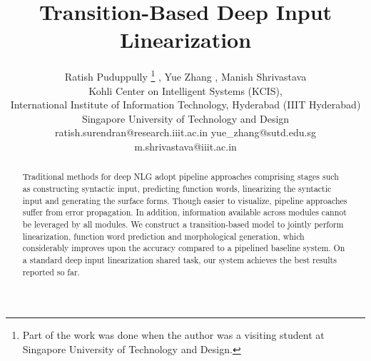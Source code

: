 \documentclass[11pt]{article}
\title{Transition-Based Deep Input Linearization}
\author{Ratish Puduppully \dag \thanks{\hspace{1.5mm}Part of the work was done when the author was a visiting student at Singapore University of Technology and Design.} , Yue Zhang \ddag, Manish Shrivastava \dag\\
  \dag Kohli Center on Intelligent Systems (KCIS),\\
International Institute of Information Technology, Hyderabad (IIIT Hyderabad)\\
  \ddag Singapore University of Technology and Design \\
  ratish.surendran@research.iiit.ac.in   \hfill yue\_zhang@sutd.edu.sg \\ m.shrivastava@iiit.ac.in\\}
\date{}
\begin{document}
\maketitle
\begin{abstract}
Traditional methods for deep NLG adopt pipeline approaches comprising stages such as constructing syntactic input, predicting function words, linearizing the syntactic input and generating the surface forms. Though easier to visualize, pipeline approaches suffer from error propagation. In addition, information available across modules cannot be leveraged by all modules. We construct a transition-based model to jointly perform linearization, function word prediction and morphological generation, which considerably improves upon the accuracy compared to a pipelined baseline system. On a standard deep input linearization shared task, our system achieves the best results reported so far.
\end{abstract}
\end{document}

